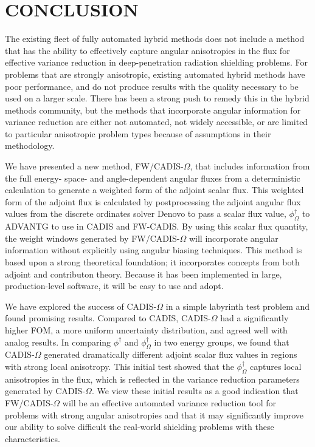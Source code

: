 \documentclass[12pt]{article}
\begin{document}
%
\section{CONCLUSION} 
\label{sect::conclusion}

The existing fleet of fully automated hybrid methods does not include a method that has the ability to effectively capture angular anisotropies in the flux for effective variance reduction in deep-penetration radiation shielding problems. For problems that are strongly anisotropic, existing automated hybrid methods have poor performance, and do not produce results with the quality necessary to be used on a larger scale. There has been a strong push to remedy this in the hybrid methods community, but the methods that incorporate angular information for variance reduction are either not automated, not widely accessible, or are limited to particular anisotropic problem types because of assumptions in their methodology. 

We have presented a new method, FW/CADIS-$\Omega$, that includes information from the full energy- space- and angle-dependent angular fluxes from a deterministic calculation to generate a weighted form of the adjoint scalar flux. This weighted form of the adjoint flux is calculated by postprocessing the adjoint angular flux values from the discrete ordinates solver Denovo to pass a scalar flux value, $\phi^{\dagger}_{\Omega}$ to ADVANTG to use in CADIS and FW-CADIS. By using this scalar flux quantity, the weight windows generated by FW/CADIS-$\Omega$ will incorporate angular information without explicitly using angular biasing techniques. This method is based upon a strong theoretical foundation; it incorporates concepts from both adjoint and contributon theory. Because it has been implemented in large, production-level software, it will be easy to use and adopt. 

We have explored the success of CADIS-$\Omega$ in a simple labyrinth test problem and found promising results. 
Compared to CADIS, CADIS-$\Omega$ had a significantly higher FOM, a more uniform uncertainty distribution, and agreed well with analog results. 
In comparing $\phi^{\dagger}$ and $\phi^{\dagger}_{\Omega}$ in two energy groups, we found that CADIS-$\Omega$ generated dramatically different adjoint scalar flux values in regions with strong local anisotropy. 
This initial test showed that the $\phi^{\dagger}_{\Omega}$ captures local anisotropies in the flux, which is reflected in the variance reduction parameters generated by CADIS-$\Omega$.
We view these initial results as a good indication that FW/CADIS-$\Omega$ will be an effective automated variance reduction tool for problems with strong angular anisotropies and that it may significantly improve our ability to solve difficult the real-world shielding problems with these characteristics. 
\end{document}
